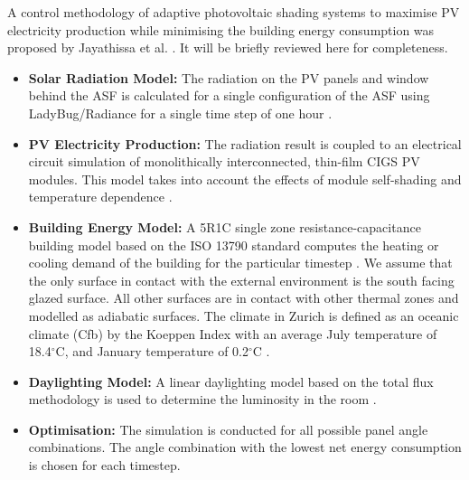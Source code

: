 
A control methodology of adaptive photovoltaic shading systems to maximise PV electricity production while minimising the building energy consumption was proposed by Jayathissa et al. \cite{jayathissa2017AE}. It will be briefly reviewed here for completeness.

\begin{itemize}
\item \textbf{Solar Radiation Model:} The radiation on the PV panels and window behind the ASF is calculated for a single configuration of the ASF using LadyBug/Radiance for a single time step of one hour \cite{roudsari2013ladybug,ward1994radiance}.
\item \textbf{PV Electricity Production:} The radiation result is coupled to an electrical circuit simulation of monolithically interconnected, thin-film CIGS PV modules. This model takes into account the effects of module self-shading and temperature dependence \cite{hofer2016parametric}.
\item \textbf{Building Energy Model:} A 5R1C single zone resistance-capacitance building model based on the ISO 13790 standard computes the heating or cooling demand of the building for the particular timestep \cite{de2008iso}. We assume that the only surface in contact with the external environment is the south facing glazed surface. All other surfaces are in contact with other thermal zones and modelled as adiabatic surfaces. The climate in Zurich is defined as an oceanic climate (Cfb) by the Koeppen Index with an average July temperature of 18.4$^{\circ}$C, and January temperature of 0.2$^{\circ}$C \cite{koppenZurich}.
\item \textbf{Daylighting Model:} A linear daylighting model based on the total flux methodology is used to determine the luminosity in the room \cite{szokolay1980handbook}. 
\item \textbf{Optimisation:} The simulation is conducted for all possible panel angle combinations. The angle combination with the lowest net energy consumption is chosen for each timestep.
\end{itemize}




